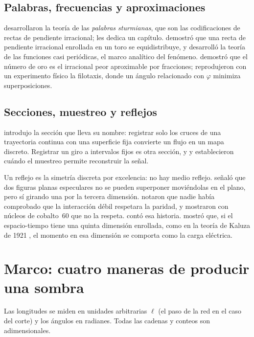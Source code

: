 \documentclass[11pt,a4paper]{article}
\begin{document}
\subsection{Palabras, frecuencias y aproximaciones}

\textcite{morse1940} desarrollaron la teoría de las \emph{palabras sturmianas}, que son las codificaciones de rectas de pendiente irracional; \textcite{lothaire2002} les dedica un capítulo. \textcite{weyl1916} demostró que una recta de pendiente irracional enrollada en un toro se equidistribuye, y \textcite{bohr1925} desarrolló la teoría de las funciones casi periódicas, el marco analítico del fenómeno. \textcite{hurwitz1891} demostró que el número de oro es el irracional peor aproximable por fracciones; \textcite{douady1992} reprodujeron con un experimento físico la filotaxis, donde un ángulo relacionado con $\varphi$ minimiza superposiciones.

\subsection{Secciones, muestreo y reflejos}

\textcite{poincare1892} introdujo la sección que lleva su nombre: registrar solo los cruces de una trayectoria continua con una superficie fija convierte un flujo en un mapa discreto. Registrar un giro a intervalos fijos es otra sección, y \textcite{nyquist1928} y \textcite{shannon1949} establecieron cuándo el muestreo permite reconstruir la señal.

Un reflejo es la simetría discreta por excelencia: no hay medio reflejo. \textcite{mobius1827} señaló que dos figuras planas especulares no se pueden superponer moviéndolas en el plano, pero sí girando una por la tercera dimensión. \textcite{lee1956} notaron que nadie había comprobado que la interacción débil respetara la paridad, y \textcite{wu1957} mostraron con núcleos de cobalto~60 que no la respeta. \textcite{gardner1964} contó esa historia. \textcite{klein1926} mostró que, si el espacio-tiempo tiene una quinta dimensión enrollada, como en la teoría de Kaluza de 1921 \parencite{kaluza1921}, el momento en esa dimensión se comporta como la carga eléctrica.

\section{Marco: cuatro maneras de producir una sombra}\label{sec:marco}

Las longitudes se miden en unidades arbitrarias $\ell$ (el paso de la red en el caso del corte) y los ángulos en radianes. Todas las cadenas y conteos son adimensionales.
\end{document}
